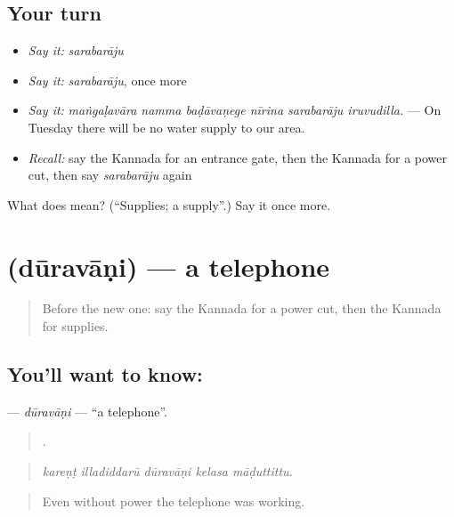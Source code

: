 \subsection*{Your turn}
\begin{itemize}
\raggedright
  \item \emph{Say it:} \emph{sarabarāju}
  \item \emph{Say it:} \emph{sarabarāju}, once more
  \item \emph{Say it:} \emph{maṅgaḷavāra namma baḍāvaṇege nīrina sarabarāju iruvudilla.} — On Tuesday there will be no water supply to our area.
  \item \emph{Recall:} say the Kannada for an entrance gate, then the Kannada for a power cut, then say \emph{sarabarāju} again
\end{itemize}

\begin{tcolorbox}[breakable,colback=teal!4,colframe=teal!35!black,title={Before you move on}]
What does  mean? (\textquotedblleft{}Supplies; a supply\textquotedblright{}.) Say it once more.
\end{tcolorbox}
\section[\texorpdfstring{\kn{ದೂರವಾಣಿ} (dūravāṇi)}{ದೂರವಾಣಿ (dūravāṇi)}]{ (dūravāṇi) — a telephone}

\label{lesson:KA-C470-duravani}



\begin{quote}
Before the new one: say the Kannada for a power cut, then the Kannada for supplies.
\end{quote}

\subsection*{You'll want to know: }
\textbf{} — \emph{dūravāṇi} — \textquotedblleft{}a telephone\textquotedblright{}.

\begin{quote}
    .
\end{quote}

\begin{quote}
\emph{kareṇṭ illadiddarū dūravāṇi kelasa māḍuttittu.}
\end{quote}

\begin{quote}
Even without power the telephone was working.
\end{quote}

